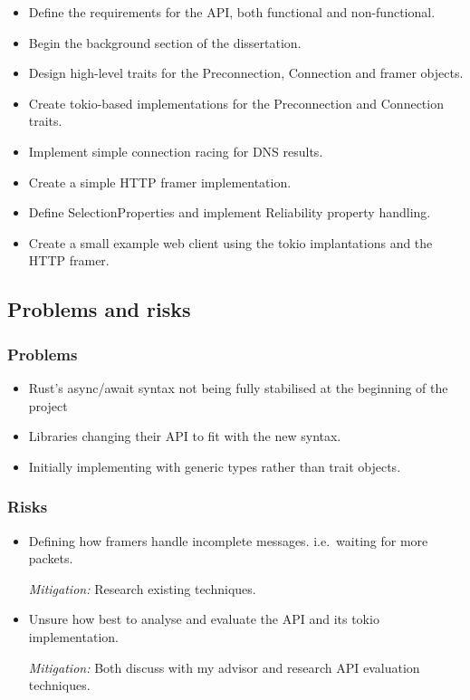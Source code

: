 \documentclass[11pt]{article}
\begin{document}
\begin{itemize}
	\item Define the requirements for the API, both functional and
		non-functional.
	\item Begin the background section of the dissertation.
	\item Design high-level traits for the Preconnection, Connection and
		framer objects.
	\item Create tokio-based implementations for the Preconnection and
		Connection traits.
	\item Implement simple connection racing for DNS results.
	\item Create a simple HTTP framer implementation.
	\item Define SelectionProperties and implement Reliability property 
		handling.
	\item Create a small example web client using the tokio implantations
		and the HTTP framer.
\end{itemize}

\subsection{Problems and risks}\label{problems-and-risks}

\subsubsection{Problems}\label{problems}

\begin{itemize}
	\item Rust's async/await syntax not being fully stabilised at the 
		beginning of the project
	\item Libraries changing their API to fit with the new syntax.
	\item Initially implementing with generic types rather than trait 
		objects.
\end{itemize}

\subsubsection{Risks}\label{risks}

\begin{itemize}
	\item Defining how framers handle incomplete messages. i.e.\ waiting for
		more packets.
		
		\emph{Mitigation:} Research existing techniques.
	\item Unsure how best to analyse and evaluate the API and its 
		tokio implementation.

		\emph{Mitigation:} Both discuss with my advisor and research
		API evaluation techniques.
\end{itemize}
\end{document}
